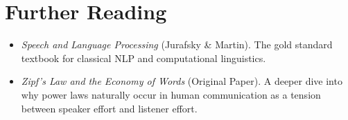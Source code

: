 \section{Further Reading}
\label{ch:05:sec:further}

\begin{itemize}
  \item \textit{Speech and Language Processing} (Jurafsky \& Martin). The gold standard textbook for classical NLP and computational linguistics.
  \item \textit{Zipf's Law and the Economy of Words} (Original Paper). A deeper dive into why power laws naturally occur in human communication as a tension between speaker effort and listener effort.
\end{itemize}
